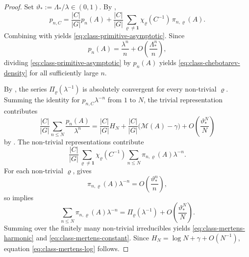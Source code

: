 \begin{proof}
  Set \(\vartheta_*:=\Lambda_*/\lambda\in(0,1)\). By
  ,
  \[
    p_{n,C}
    =
    \frac{|C|}{|G|}p_n(A)
    +\frac{|C|}{|G|}
      \sum_{\varrho\neq\mathbf 1}
        \chi_\varrho(C^{-1})\,\pi_{n,\varrho}(A).
  \]
  Combining  with
   yields
  \eqref{eq:class-primitive-asymptotic}.
  Since
  \[
    p_n(A)=\frac{\lambda^n}{n}+O\!\left(\frac{\Lambda_*^n}{n}\right),
  \]
  dividing \eqref{eq:class-primitive-asymptotic} by \(p_n(A)\) yields
  \eqref{eq:class-chebotarev-density} for all sufficiently large \(n\).

  By , the series
  \(\Pi_\varrho(\lambda^{-1})\) is absolutely convergent for every
  non-trivial \(\varrho\). Summing the identity for
  \(p_{n,C}\lambda^{-n}\) from \(1\) to \(N\), the trivial
  representation contributes
  \[
    \frac{|C|}{|G|}\sum_{n\le N}\frac{p_n(A)}{\lambda^n}
    =
    \frac{|C|}{|G|}H_N
    +\frac{|C|}{|G|}\bigl(\mathcal M(A)-\gamma\bigr)
    +O\!\left(\frac{\vartheta_*^N}{N}\right)
  \]
  by . The non-trivial
  representations contribute
  \[
    \frac{|C|}{|G|}
      \sum_{\varrho\neq\mathbf 1}\chi_\varrho(C^{-1})
      \sum_{n\le N}\pi_{n,\varrho}(A)\lambda^{-n}.
  \]
  For each non-trivial \(\varrho\),
   gives
  \[
    \pi_{n,\varrho}(A)\lambda^{-n}
    =O\!\left(\frac{\vartheta_*^n}{n}\right),
  \]
  so  implies
  \[
    \sum_{n\le N}\pi_{n,\varrho}(A)\lambda^{-n}
    =
    \Pi_\varrho(\lambda^{-1})
    +O\!\left(\frac{\vartheta_*^N}{N}\right).
  \]
  Summing over the finitely many non-trivial irreducibles yields
  \eqref{eq:class-mertens-harmonic} and
  \eqref{eq:class-mertens-constant}. Since
  \(H_N=\log N+\gamma+O(N^{-1})\), equation
  \eqref{eq:class-mertens-log} follows.
\end{proof}

